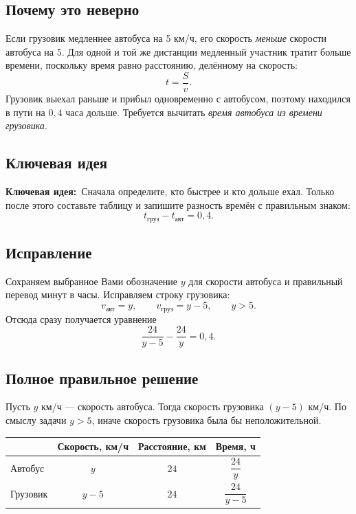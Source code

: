 \documentclass[a4paper,12pt]{article}
\newcommand{\keylabel}{\textcolor{accent}{\textbf{Ключевая идея:}}}
\begin{document}
\subsection*{Почему это неверно}
Если грузовик медленнее автобуса на 5 км/ч, его скорость \emph{меньше} скорости автобуса на 5. Для одной и той же дистанции медленный участник тратит больше времени, поскольку время равно расстоянию, делённому на скорость:
\[
 t=\frac{S}{v}.
\]
Грузовик выехал раньше и прибыл одновременно с автобусом, поэтому находился в пути на $0{,}4$ часа дольше. Требуется вычитать \emph{время автобуса из времени грузовика}.

\subsection*{Ключевая идея}
\keylabel\ Сначала определите, кто быстрее и кто дольше ехал. Только после этого составьте таблицу и запишите разность времён с правильным знаком:
\[
 t_{\text{груз}}-t_{\text{авт}}=0{,}4.
\]

\subsection*{Исправление}
Сохраняем выбранное Вами обозначение $y$ для скорости автобуса и правильный перевод минут в часы. Исправляем строку грузовика:
\[
 v_{\text{авт}}=y,\qquad v_{\text{груз}}=y-5,\qquad y>5.
\]
Отсюда сразу получается уравнение
\[
 \frac{24}{y-5}-\frac{24}{y}=0{,}4.
\]

\subsection*{Полное правильное решение}
Пусть $y$ км/ч --- скорость автобуса. Тогда скорость грузовика $(y-5)$ км/ч. По смыслу задачи $y>5$, иначе скорость грузовика была бы неположительной.

\begin{center}
\small
\begin{tabular}{@{}lccc@{}}
\toprule
 & Скорость, км/ч & Расстояние, км & Время, ч\\
\midrule
Автобус & $y$ & $24$ & $\dfrac{24}{y}$\\[2mm]
Грузовик & $y-5$ & $24$ & $\dfrac{24}{y-5}$\\
\bottomrule
\end{tabular}
\end{center}
\end{document}
